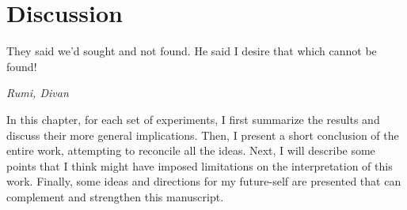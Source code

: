 \chapter{Discussion}
\label{ch:discussion}
{\singlespacing \epigraph{They said we'd sought and not found. He said I desire that which cannot be found!}
{\textit{Rumi, Divan}}}
\noindent
In this chapter, for each set of experiments, I first summarize the results and discuss their more general implications.
Then, I present a short conclusion of the entire work, attempting to reconcile all the ideas.
Next, I will describe some points that I think might have imposed limitations on the interpretation of this work.
Finally, some ideas and directions for my future-self are presented that can complement and strengthen this manuscript.




